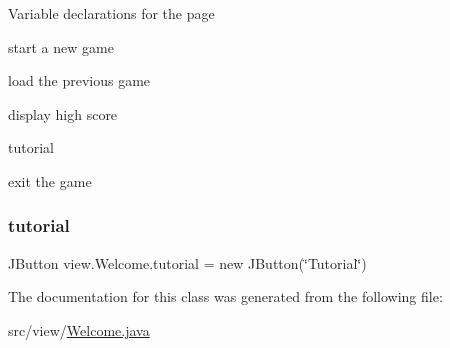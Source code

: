 Variable declarations for the page
\begin{DoxyItemize}
\item start a new game
\item load the previous game
\item display high score
\item tutorial
\item exit the game 
\end{DoxyItemize}\hypertarget{classview_1_1_welcome_a8fae2e33d73c97d4bbcc331f050bd68c}{}\label{classview_1_1_welcome_a8fae2e33d73c97d4bbcc331f050bd68c} 
\subsubsection{\texorpdfstring{tutorial}{tutorial}}
{\footnotesize\ttfamily J\+Button view.\+Welcome.\+tutorial = new J\+Button(\char`\"{}Tutorial\char`\"{})\hspace{0.3cm}{\ttfamily [private]}}



The documentation for this class was generated from the following file\+:\begin{DoxyCompactItemize}
\item 
src/view/\hyperlink{_welcome_8java}{Welcome.\+java}\end{DoxyCompactItemize}

